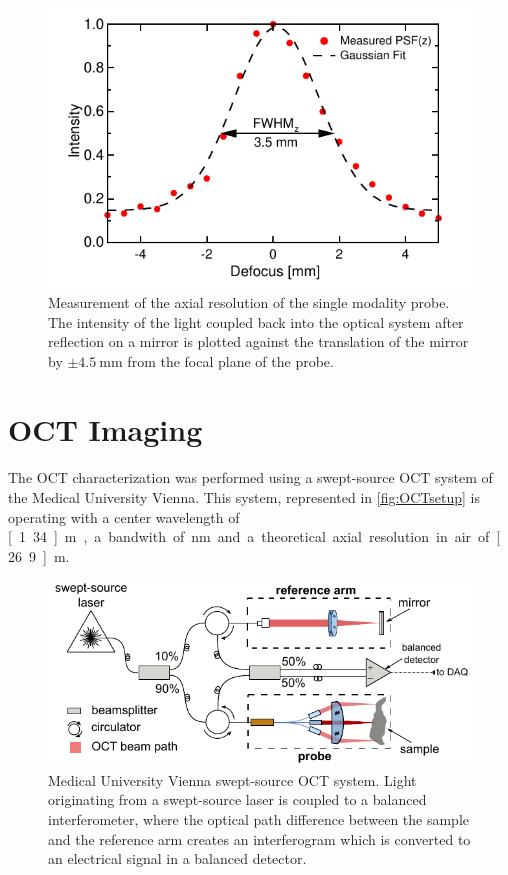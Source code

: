 \begin{figure}[h!]\centering \includegraphics{figures/50_Measurements/conf/res/PSFz.pdf}
      \caption{Measurement of the axial resolution of the single modality probe. The intensity of the light coupled back into the optical system after reflection on a mirror is plotted against the translation of the mirror by $\pm \SI{4.5}{\milli\meter}$ from the focal plane of the probe. }
      \label{fig:FWHM}
\end{figure}




\clearpage
\section{OCT Imaging}

The OCT characterization was performed using a swept-source OCT system of the Medical University Vienna. This system, represented in \autoref{fig:OCTsetup} is operating with a center wavelength of \unit[1.34]{\textmu m}, a bandwith of \unit[37]{nm} and a theoretical axial resolution in air of \unit[26.9]{\textmu m}.

\begin{figure}[h!]\centering \includegraphics[width=12cm]{figures/50_Measurements/oct/octSetupVienna.pdf}
      \caption{Medical University Vienna swept-source OCT system. Light originating from a swept-source laser is coupled to a balanced interferometer, where the optical path difference between the sample and the reference arm creates an interferogram which is converted to an electrical signal in a balanced detector.}
      \label{fig:OCTsetup}
\end{figure}

